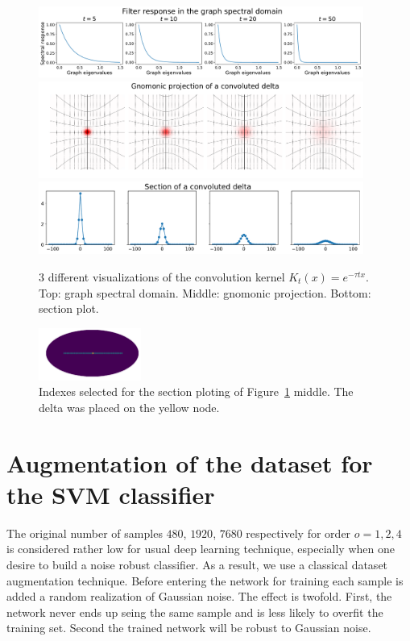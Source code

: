 \documentclass[final,twocolumn,3p,times,authoryear]{elsarticle}
\newcommand{\figref}[1]{Figure~\ref{fig:#1}}
\newcommand{\1}{\b{1}}              %
\newcommand{\0}{\b{0}}              %
\begin{document}
\begin{figure}[!ht]
\centering
\includegraphics[width=0.95\textwidth]{figures/gaussian_filters_spectral.pdf}
\includegraphics[width=0.95\textwidth]{figures/gaussian_filters_gnomonic.pdf}
\includegraphics[width=0.95\textwidth]{figures/gaussian_filters_section.pdf}
\caption{3 different visualizations of the convolution kernel $K_t(x)=e^{-\tau t x}$.
Top: graph spectral domain.
Middle: gnomonic projection.
Bottom: section plot.}
\label{fig:gaussian_filters_visualization}
\end{figure}

\begin{figure}[!ht]
\centering
\includegraphics[width=0.3\textwidth]{figures/index_plotting_order20_nside16.pdf}
\caption{Indexes selected for the section ploting of \figref{gaussian_filters_visualization} middle. The delta was placed on the yellow node.}
\label{fig:index_section}
\end{figure}

\section{Augmentation of the dataset for the SVM classifier}
\label{sec:dataset_augmentation} The original number of samples $480$, $1920$,
$7680$ respectively for order $o=1,2,4$ is considered rather low for usual
deep learning technique, especially when one desire to build a noise robust
classifier. As a result, we use a classical dataset augmentation technique.
Before entering the network for training each sample is added a random
realization of Gaussian noise. The effect is twofold. First, the network never
ends up seing the same sample and is less likely to overfit the training set.
Second the trained network will be robust to Gaussian noise.
\end{document}

